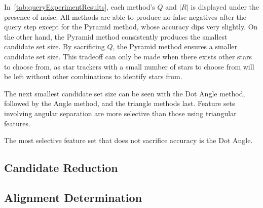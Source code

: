 \begin{table}
\end{table}

In~\autoref{tab:queryExperimentResults}, each method's $Q$ and $\lvert R \rvert$ is displayed under the presence of
noise.
All methods are able to produce no false negatives after the query step except for the Pyramid method, whose accuracy
dips very slightly.
On the other hand, the Pyramid method consistently produces the smallest candidate set size.
By sacrificing $Q$, the Pyramid method ensures a smaller candidate set size.
This tradeoff can only be made when there exists other stars to choose from, as star trackers with a small number of
stars to choose from will be left without other combinations to identify stars from.

The next smallest candidate set size can be seen with the Dot Angle method, followed by the Angle method, and the
triangle methods last.
Feature sets involving angular separation are more selective than those using triangular features.


The most selective feature set that does not sacrifice accuracy is the Dot Angle.

\subsection{Candidate Reduction}\label{subsec:candidateReductionResults}


\subsection{Alignment Determination}\label{subsec:alignmentDeterminationResults}


